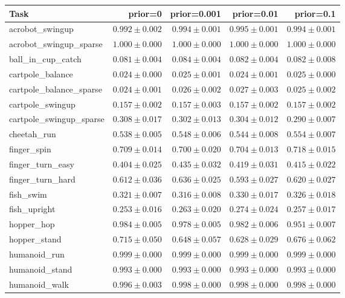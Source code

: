 \begin{tabular}{lrrrr}
  \toprule
  Task & prior=0 & prior=0.001 & prior=0.01 & prior=0.1 \\
  \midrule
  acrobot\_swingup & $0.992\pm0.002$ & $0.994\pm0.001$ & $0.995\pm0.001$ & $0.994\pm0.001$ \\
  acrobot\_swingup\_sparse & $1.000\pm0.000$ & $1.000\pm0.000$ & $1.000\pm0.000$ & $1.000\pm0.000$ \\
  ball\_in\_cup\_catch & $0.081\pm0.004$ & $0.084\pm0.004$ & $0.082\pm0.004$ & $0.082\pm0.008$ \\
  cartpole\_balance & $0.024\pm0.000$ & $0.025\pm0.001$ & $0.024\pm0.001$ & $0.025\pm0.000$ \\
  cartpole\_balance\_sparse & $0.024\pm0.001$ & $0.026\pm0.002$ & $0.027\pm0.003$ & $0.025\pm0.002$ \\
  cartpole\_swingup & $0.157\pm0.002$ & $0.157\pm0.003$ & $0.157\pm0.002$ & $0.157\pm0.002$ \\
  cartpole\_swingup\_sparse & $0.308\pm0.017$ & $0.302\pm0.013$ & $0.304\pm0.012$ & $0.290\pm0.007$ \\
  cheetah\_run & $0.538\pm0.005$ & $0.548\pm0.006$ & $0.544\pm0.008$ & $0.554\pm0.007$ \\
  finger\_spin & $0.709\pm0.014$ & $0.700\pm0.020$ & $0.704\pm0.013$ & $0.718\pm0.015$ \\
  finger\_turn\_easy & $0.404\pm0.025$ & $0.435\pm0.032$ & $0.419\pm0.031$ & $0.415\pm0.022$ \\
  finger\_turn\_hard & $0.612\pm0.036$ & $0.636\pm0.025$ & $0.593\pm0.027$ & $0.620\pm0.027$ \\
  fish\_swim & $0.321\pm0.007$ & $0.316\pm0.008$ & $0.330\pm0.017$ & $0.326\pm0.018$ \\
  fish\_upright & $0.253\pm0.016$ & $0.263\pm0.020$ & $0.274\pm0.024$ & $0.257\pm0.017$ \\
  hopper\_hop & $0.984\pm0.005$ & $0.978\pm0.005$ & $0.982\pm0.006$ & $\mathbf{0.951\pm0.007}$ \\
  hopper\_stand & $0.715\pm0.050$ & $\mathbf{0.648\pm0.057}$ & $\mathbf{0.628\pm0.029}$ & $0.676\pm0.062$ \\
  humanoid\_run & $0.999\pm0.000$ & $0.999\pm0.000$ & $0.999\pm0.000$ & $0.999\pm0.000$ \\
  humanoid\_stand & $0.993\pm0.000$ & $0.993\pm0.000$ & $0.993\pm0.000$ & $0.993\pm0.000$ \\
  humanoid\_walk & $0.996\pm0.003$ & $0.998\pm0.000$ & $0.998\pm0.000$ & $0.998\pm0.000$ \\

\end{tabular}
